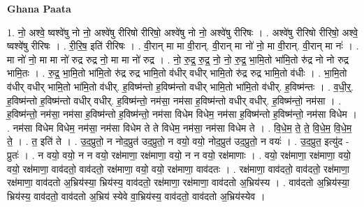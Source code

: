 \documentclass[17pt]{extarticle}
\begin{document}
\textbf{Ghana Paata } \newline

1. नो॒ अश्वे॒ ष्वश्वे॑षु नो नो॒ अश्वे॑षु रीरिषो रीरिषो॒ अश्वे॑षु नो नो॒ अश्वे॑षु रीरिषः । . अश्वे॑षु रीरिषो रीरिषो॒ अश्वे॒ ष्वश्वे॑षु रीरिषः । . री॒रि॒ष॒ इति॑ रीरिषः । . वी॒रान् मा मा वी॒रान्. वी॒रान् मा नो॑ नो॒ मा वी॒रान्. वी॒रान् मा नः॑ । . मा नो॑ नो॒ मा मा नो॑ रुद्र रुद्र नो॒ मा मा नो॑ रुद्र । . नो॒ रु॒द्र॒ रु॒द्र॒ नो॒ नो॒ रु॒द्र॒ भा॒मि॒तो भा॑मि॒तो रु॑द्र नो नो रुद्र भामि॒तः । . रु॒द्र॒ भा॒मि॒तो भा॑मि॒तो रु॑द्र रुद्र भामि॒तो व॑धीर् वधीर् भामि॒तो रु॑द्र रुद्र भामि॒तो व॑धीः । . भा॒मि॒तो व॑धीर् वधीर् भामि॒तो भा॑मि॒तो व॑धीर्. ह॒विष्म॑न्तो ह॒विष्म॑न्तो वधीर् भामि॒तो भा॑मि॒तो व॑धीर्. ह॒विष्म॑न्तः । . व॒धी॒र्॒. ह॒विष्म॑न्तो ह॒विष्म॑न्तो वधीर् वधीर्. ह॒विष्म॑न्तो॒ नम॑सा॒ नम॑सा ह॒विष्म॑न्तो वधीर् वधीर्. ह॒विष्म॑न्तो॒ नम॑सा । . ह॒विष्म॑न्तो॒ नम॑सा॒ नम॑सा ह॒विष्म॑न्तो ह॒विष्म॑न्तो॒ नम॑सा विधेम विधेम॒ नम॑सा 
ह॒विष्म॑न्तो ह॒विष्म॑न्तो॒ नम॑सा विधेम । . नम॑सा विधेम विधेम॒ नम॑सा॒ नम॑सा विधेम ते ते विधेम॒ नम॑सा॒ नम॑सा विधेम ते । . वि॒धे॒म॒ ते॒ ते॒ वि॒धे॒म॒ वि॒धे॒म॒ ते॒ । . त॒ इति॑ ते । . उ॒द॒प्रुतो॒ न नोद॒प्रुत॑ उद॒प्रुतो॒ न वयो॒ वयो॒ नोद॒प्रुत॑ उद॒प्रुतो॒ न वयः॑ । . उ॒द॒प्रुत॒ इत्यु॑द - प्रुतः॑ । . न वयो॒ वयो॒ न न वयो॒ रक्ष॑माणा॒ रक्ष॑माणा॒ वयो॒ न न वयो॒ रक्ष॑माणाः । . वयो॒ रक्ष॑माणा॒ रक्ष॑माणा॒ वयो॒ वयो॒ रक्ष॑माणा॒ वाव॑दतो॒ वाव॑दतो॒ रक्ष॑माणा॒ 
वयो॒ वयो॒ रक्ष॑माणा॒ वाव॑दतः । . रक्ष॑माणा॒ वाव॑दतो॒ वाव॑दतो॒ रक्ष॑माणा॒ रक्ष॑माणा॒ वाव॑दतो अ॒भ्रिय॑स्या॒ भ्रिय॑स्य॒ वाव॑दतो॒ रक्ष॑माणा॒ रक्ष॑माणा॒ वाव॑दतो अ॒भ्रिय॑स्य । . वाव॑दतो अ॒भ्रिय॑स्या॒ भ्रिय॑स्य॒ वाव॑दतो॒ वाव॑दतो अ॒भ्रिय॑ स्येवे वा॒भ्रिय॑स्य॒ वाव॑दतो॒ वाव॑दतो अ॒भ्रिय॑स्येव । \newline
\end{document}
